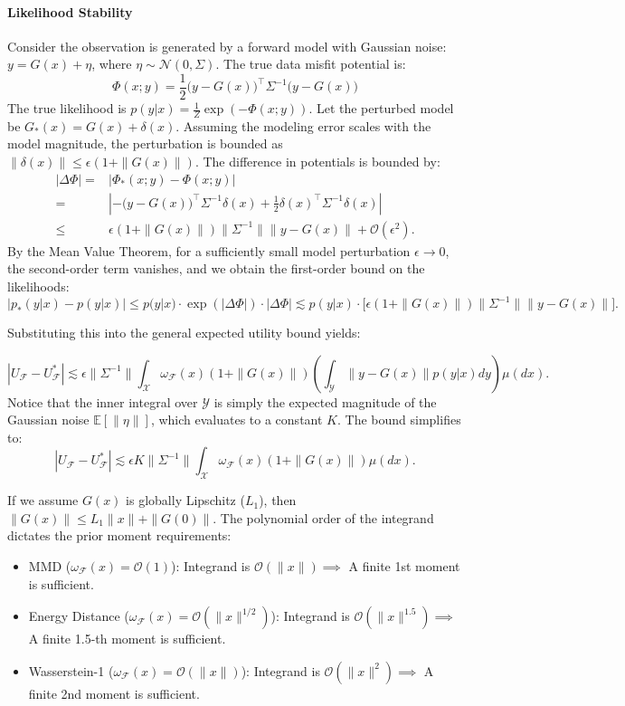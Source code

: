 \documentclass[twoside,11pt]{article}
\begin{document}
\paragraph{Likelihood Stability} Consider the observation is generated by a forward model with Gaussian noise: $y = G(x) + \eta$, where $\eta \sim \mathcal{N}(0, \Sigma)$. The true data misfit potential is:$$\Phi(x; y) = \frac{1}{2} \big( y - G(x) \big)^\top \Sigma^{-1} \big( y - G(x) \big)$$The true likelihood is $p(y|x) = \frac{1}{Z}\exp(-\Phi(x;y))$. Let the perturbed model be $G_*(x) = G(x) + \delta(x)$. Assuming the modeling error scales with the model magnitude, the perturbation is bounded as $\|\delta(x)\| \le \epsilon(1 + \|G(x)\|)$. The difference in potentials is bounded by:
$$
\begin{aligned}
    |\Delta \Phi| = & \left| \Phi_*(x; y) - \Phi(x; y) \right| \\
    = & \left| - \big( y - G(x) \big)^\top \Sigma^{-1} \delta(x) + \frac{1}{2} \delta(x)^\top \Sigma^{-1} \delta(x) \right| \\
    \le &  \epsilon (1 + \|G(x)\|) \|\Sigma^{-1}\| \|y - G(x)\| + \mathcal{O}(\epsilon^2).
\end{aligned}
$$
By the Mean Value Theorem, for a sufficiently small model perturbation $\epsilon \to 0$, the second-order term vanishes, and we obtain the first-order bound on the likelihoods:$$\left| p_*(y|x) - p(y|x) \right| \le p(y|x) \cdot \exp(|\Delta \Phi|) \cdot |\Delta \Phi| \lesssim p(y|x) \cdot \Big[ \epsilon (1 + \|G(x)\|) \|\Sigma^{-1}\| \|y - G(x)\| \Big].$$

Substituting this into the general expected utility bound yields:

$$|U_{\mathcal{F}} - U_{\mathcal{F}}^*| \lesssim \epsilon \|\Sigma^{-1}\| \int_{\mathcal{X}} \omega_{\mathcal{F}}(x) (1 + \|G(x)\|) \left( \int_{\mathcal{Y}} \|y - G(x)\| p(y|x) dy \right) \mu(dx).$$Notice that the inner integral over $\mathcal{Y}$ is simply the expected magnitude of the Gaussian noise $\mathbb{E}[\|\eta\|]$, which evaluates to a constant $K$. The bound simplifies to:$$|U_{\mathcal{F}} - U_{\mathcal{F}}^*| \lesssim \epsilon K \|\Sigma^{-1}\| \int_{\mathcal{X}} \omega_{\mathcal{F}}(x) (1 + \|G(x)\|) \mu(dx).$$

If we assume $G(x)$ is globally Lipschitz ($L_1$), then $\|G(x)\| \le L_1\|x\| + \|G(0)\|$. The polynomial order of the integrand dictates the prior moment requirements:
\begin{itemize}
    \item MMD ($\omega_{\mathcal{F}}(x) = \mathcal{O}(1)$): Integrand is $\mathcal{O}(\|x\|) \implies$ A finite 1st moment is sufficient.
    \item Energy Distance ($\omega_{\mathcal{F}}(x) = \mathcal{O}(\|x\|^{1/2})$): Integrand is $\mathcal{O}(\|x\|^{1.5}) \implies$ A finite 1.5-th moment is sufficient.
    \item Wasserstein-1 ($\omega_{\mathcal{F}}(x) = \mathcal{O}(\|x\|)$): Integrand is $\mathcal{O}(\|x\|^2) \implies$ A finite 2nd moment is sufficient.
\end{itemize}
\end{document}

